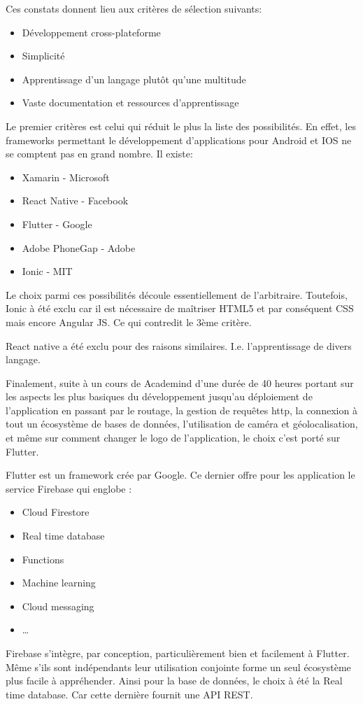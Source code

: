     Ces constats donnent lieu aux critères de sélection suivants:
    \smallskip
    \begin{itemize}
        \item Développement cross-plateforme
        \item Simplicité
        \item Apprentissage d'un langage plutôt qu'une multitude
        \item Vaste documentation et ressources d'apprentissage
    \end{itemize}
    \smallskip
    Le premier critères est celui qui réduit le plus la liste des possibilités. En effet, les frameworks 
    permettant le développement d'applications pour Android et IOS ne se comptent pas en grand nombre. Il existe:
    \smallskip
    \begin{itemize}
        \item Xamarin - Microsoft
        \item React Native - Facebook
        \item Flutter - Google
        \item Adobe PhoneGap - Adobe
        \item Ionic - MIT
    \end{itemize}
    \smallskip
    Le choix parmi ces possibilités découle essentiellement de l'arbitraire. Toutefois, Ionic à été exclu
    car il est nécessaire de maîtriser HTML5 et par conséquent CSS mais encore Angular JS. Ce qui contredit le 3ème critère.

    React native a été exclu pour des raisons similaires. I.e. l'apprentissage de divers langage.

    Finalement, suite à un cours de Academind d'une durée de 40 heures portant sur les aspects les
    plus basiques du développement jusqu'au déploiement de l'application en passant par le routage, la gestion de requêtes http,
    la connexion à tout un écosystème de bases de données, l'utilisation de caméra et géolocalisation, et même sur 
    comment changer le logo de l'application, le choix c'est porté sur Flutter.

    Flutter est un framework crée par Google. Ce dernier offre pour les application le service Firebase qui englobe :
    \smallskip
    \begin{itemize}
        \item Cloud Firestore
        \item Real time database
        \item Functions
        \item Machine learning
        \item Cloud messaging
        \item \dots
    \end{itemize}
    \smallskip
    Firebase s'intègre, par conception, particulièrement bien et facilement à Flutter. Même s'ils sont
    indépendants leur utilisation conjointe forme un seul écosystème plus facile à appréhender. Ainsi pour la 
    base de données, le choix à été la Real time database. Car cette dernière fournit une API REST.

